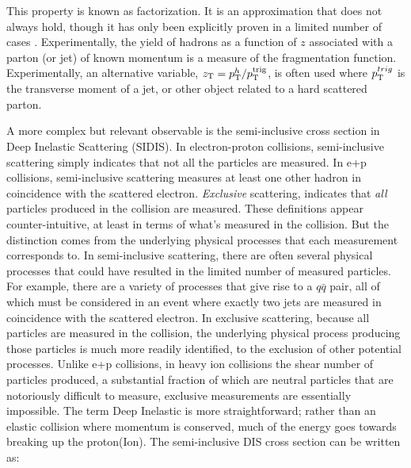   This property is known as factorization. It is an approximation that does not always hold, though it has only been explicitly proven in a limited number of cases \cite{Collins1989}. Experimentally, the yield of hadrons as a function of $z$ associated with a parton (or jet) of known momentum is a measure of the fragmentation function. Experimentally, an alternative variable, $z_{\mathrm{T}}=p_{\mathrm{T}}^h/p_{\mathrm{T}}^\mathrm{trig}$, is often used where $p_{\mathrm{T}}^{trig}$ is the transverse moment of a jet, or other object related to a hard scattered parton. 

A more complex but relevant observable is the semi-inclusive cross section in Deep Inelastic Scattering (SIDIS). In electron-proton collisions, semi-inclusive scattering simply indicates that not all the particles are measured. In e+p collisions, semi-inclusive scattering measures at least one other hadron in coincidence with the scattered electron. \textit{Exclusive} scattering, indicates that \textit{all} particles produced in the collision are measured. These definitions appear counter-intuitive, at least in terms of what's measured in the collision. But the distinction comes from the underlying physical processes that each measurement corresponds to. In semi-inclusive scattering, there are often several physical processes that could have resulted in the limited number of measured particles. For example, there are a variety of processes that give rise to a $q\bar{q}$ pair, all of which must be considered in an event where exactly two jets are measured in coincidence with the scattered electron. In exclusive scattering, because all particles are measured in the collision, the underlying physical process producing those particles is much  more readily identified, to the exclusion of other potential processes. Unlike e+p collisions, in heavy ion collisions the shear number of particles produced, a substantial fraction of which are neutral particles that are notoriously difficult to measure, exclusive measurements are essentially impossible. The term Deep Inelastic is more straightforward; rather than an elastic collision where momentum is conserved, much of the energy goes towards breaking up the proton(Ion). The semi-inclusive DIS cross section can be written as:


